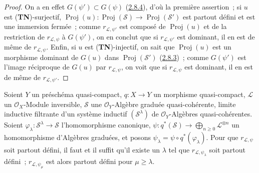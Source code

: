 \begin{proof}
On a en effet $G(\psi')\subset G(\psi)$
(\hyperref[II.2.8.4-fr]{2.8.4}), d'où la première assertion~; si $u$ est
(\textbf{TN})-surjectif,
$\operatorname{Proj}(u):\operatorname{Proj}(\mathcal{S})\to
\operatorname{Proj}(\mathcal{S}')$ est partout défini et est une immersion
fermée~; comme $r_{\mathcal{L},\psi'}$ est composé de
$\operatorname{Proj}(u)$ et de la restriction de $r_{\mathcal{L},\psi}$ à
$G(\psi')$, on en conclut que si $r_{\mathcal{L},\psi'}$ est dominant, il en
est de même de $r_{\mathcal{L},\psi}$. Enfin, si $u$ est
(\textbf{TN})-injectif, on sait que $\operatorname{Proj}(u)$ est un morphisme
dominant de $G(u)$ dans $\operatorname{Proj}(\mathcal{S}')$
(\hyperref[II.2.8.3-fr]{2.8.3})~; comme $G(\psi')$ est l'image réciproque de
$G(u)$ par $r_{\mathcal{L},\psi}$, on voit que si $r_{\mathcal{L},\psi}$ est
dominant, il en est de même de $r_{\mathcal{L},\psi'}$.
\end{proof}

\begin{proposition}[3.7.7]
\label{II.3.7.7-fr}
Soient $Y$ un préschéma quasi-compact, $q:X\to Y$ un morphisme quasi-compact,
$\mathcal{L}$ un $\mathcal{O}_X$-Module inversible, $\mathcal{S}$ une
$\mathcal{O}_Y$-Algèbre graduée quasi-cohérente, limite inductive filtrante
d'un système inductif $(\mathcal{S}^\lambda)$ de $\mathcal{O}_Y$-Algèbres
quasi-cohérentes. Soient
$\varphi_\lambda:\mathcal{S}^\lambda\to\mathcal{S}$ l'homomorphisme
canonique,
$\psi:q^*(\mathcal{S})\to\bigoplus_{n\geq0}\mathcal{L}^{\otimes n}$ un
homomorphisme d'Algèbres graduées, et posons
$\psi_\lambda=\psi\circ q^*(\varphi_\lambda)$. Pour que
$r_{\mathcal{L},\psi}$ soit partout défini, il faut et il suffit qu'il existe
un $\lambda$ tel que $r_{\mathcal{L},\psi_\lambda}$ soit partout défini~;
$r_{\mathcal{L},\psi_\mu}$ est alors partout défini pour $\mu\geq\lambda$.
\end{proposition}

